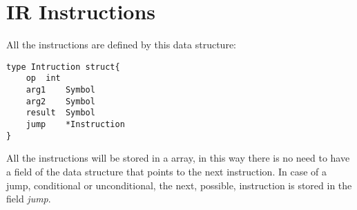 
\section*{IR Instructions}
All the instructions are defined by this data structure:
\begin{lstlisting}
type Intruction struct{
	op	int
	arg1	Symbol
	arg2	Symbol
	result	Symbol
	jump	*Instruction
}
\end{lstlisting}
All the instructions will be stored in a array, in this way there is no need to have a field of the data structure that points to the next instruction. In case of a jump, conditional or unconditional, the next, possible, instruction is stored in the field \emph{jump}.

 




